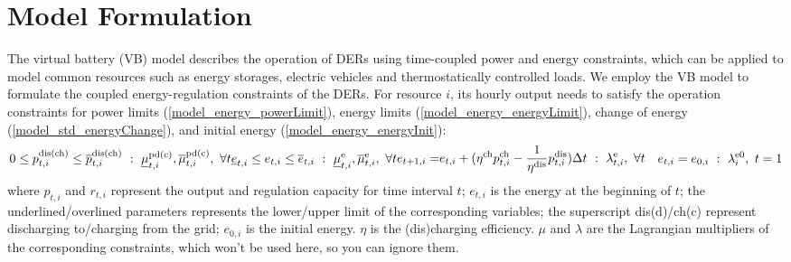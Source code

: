 \documentclass[conference,a4paper]{IEEEtran}
\begin{document}
\section{Model Formulation}\label{sec_method}

The virtual battery (VB) model describes the operation of DERs using time-coupled power and energy constraints, which can be applied to model common resources such as energy storages, electric vehicles and thermostatically controlled loads. We employ the VB model to formulate the coupled energy-regulation constraints of the DERs. For resource $i$, its hourly output needs to satisfy the operation constraints for power limits (\ref{model_energy_powerLimit}), energy limits (\ref{model_energy_energyLimit}), change of energy (\ref{model_std_energyChange}), and initial energy (\ref{model_energy_energyInit}):
\begin{subequations}\label{model_energy}
  \begin{equation}\label{model_energy_powerLimit}
    0 \le p^{\rm dis(ch)}_{t, i} \le \overline{p}^{\rm dis(ch)}_{t, i} \ : \ \underline{\mu}^{\rm pd(c)}_{t, i}, \overline{\mu}^{\rm pd(c)}_{t, i}, \ \forall  t
  \end{equation}\vspace{-0ex}
  \begin{equation}\label{model_energy_energyLimit}
    \underline{e}_{t, i} \le e_{t, i} \le \overline{e}_{t, i} \ : \ \underline{\mu}^{\rm e}_{t, i}, \overline{\mu}^{\rm e}_{t, i},\ \forall t
  \end{equation}\vspace{-0ex}
  \begin{align}\label{model_std_energyChange}
    e_{t+1, i} = & e_{t, i} + 
    (\eta^{\rm ch} p^{\rm ch}_{t, i} -  \frac{1}{\eta^{\rm dis}} p^{\rm dis}_{t, i}) \Delta t \ : \ \lambda^{\rm e}_{t, i},\ \forall t
  \end{align}\vspace{-0ex}
  \begin{equation}\label{model_energy_energyInit}
    e_{t, i} = e_{0, i} \ : \ \lambda^{\rm e0}_{i},\ t = 1
  \end{equation}
\end{subequations}
where $p_{t, i}$ and $r_{t, i}$ represent the output and regulation capacity for time interval $t$; $e_{t, i}$ is the energy at the beginning of $t$; the underlined/overlined parameters represents the lower/upper limit of the corresponding variables; the superscript dis(d)/ch(c) represent discharging to/charging from the grid; $e_{0, i}$ is the initial energy. $\eta$ is the (dis)charging efficiency. $\mu$ and $\lambda$ are the Lagrangian multipliers of the corresponding constraints, which won't be used here, so you can ignore them.
\end{document}
